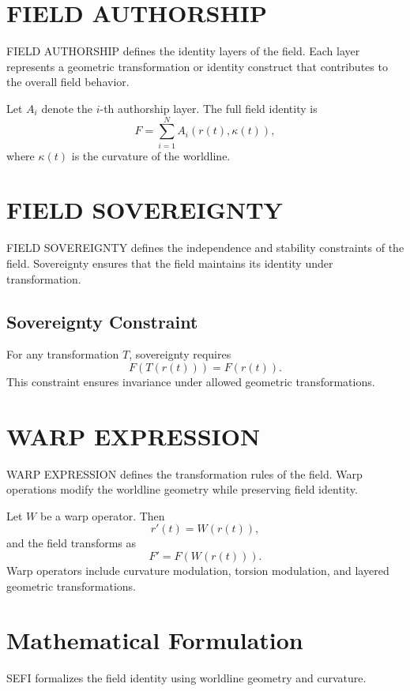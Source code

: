 \documentclass[12pt]{article}
\begin{document}
\section{FIELD AUTHORSHIP}
FIELD AUTHORSHIP defines the identity layers of the field. Each layer represents a geometric transformation or identity construct that contributes to the overall field behavior.

Let \( A_i \) denote the \( i \)-th authorship layer. The full field identity is
\begin{equation}
F = \sum_{i=1}^{N} A_i(r(t), \kappa(t)),
\end{equation}
where \( \kappa(t) \) is the curvature of the worldline.

\section{FIELD SOVEREIGNTY}
FIELD SOVEREIGNTY defines the independence and stability constraints of the field. Sovereignty ensures that the field maintains its identity under transformation.

\subsection{Sovereignty Constraint}
For any transformation \( T \), sovereignty requires
\begin{equation}
F(T(r(t))) = F(r(t)).
\end{equation}
This constraint ensures invariance under allowed geometric transformations.

\section{WARP EXPRESSION}
WARP EXPRESSION defines the transformation rules of the field. Warp operations modify the worldline geometry while preserving field identity.

Let \( W \) be a warp operator. Then
\begin{equation}
r'(t) = W(r(t)),
\end{equation}
and the field transforms as
\begin{equation}
F' = F(W(r(t))).
\end{equation}
Warp operators include curvature modulation, torsion modulation, and layered geometric transformations.

\section{Mathematical Formulation}
SEFI formalizes the field identity using worldline geometry and curvature.
\end{document}
